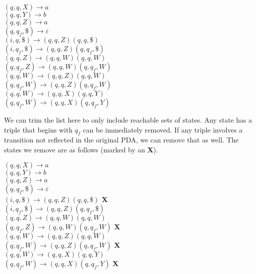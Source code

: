 \documentclass{article}
\begin{document}
\begin{center}
	$(q, q, X) \rightarrow a$ \\
	$(q, q, Y) \rightarrow b$ \\
	$(q, q, Z) \rightarrow a$ \\
	$(q, q_f, \$) \rightarrow \varepsilon$ \\
	\hfill \break
	$(i, q, \$) \rightarrow (q, q, Z)(q, q, \$)$ \\ 
	$(i, q_f, \$) \rightarrow (q, q, Z)(q, q_f, \$)$ \\
	\hfill \break
	$(q, q, Z) \rightarrow (q, q, W)(q, q, W)$ \\
	$(q, q_f, Z) \rightarrow (q, q, W)(q, q_f, W)$ \\
	\hfill \break
	$(q, q, W) \rightarrow (q, q, Z)(q, q, W)$ \\
	$(q, q_f, W) \rightarrow (q, q, Z)(q, q_f, W)$ \\
	\hfill \break
	$(q, q, W) \rightarrow (q, q, X)(q, q, Y)$ \\
	$(q, q_f, W) \rightarrow (q, q, X)(q, q_f, Y)$ \\
\end{center}

We can trim the list here to only include reachable sets of states. Any state has a triple that begins with $q_f$ can be immediately removed. If any triple involves a transition not reflected in the original PDA, we can remove that as well. The states we remove are as follows (marked by an \textbf{X}). 

\begin{center}
	$(q, q, X) \rightarrow a$ \\
	$(q, q, Y) \rightarrow b$ \\
	$(q, q, Z) \rightarrow a$ \\
	$(q, q_f, \$) \rightarrow \varepsilon$ \\
	\hfill \break
	$(i, q, \$) \rightarrow (q, q, Z)(q, q, \$)$ \textbf{X} \\ 
	$(i, q_f, \$) \rightarrow (q, q, Z)(q, q_f, \$)$ \\
	\hfill \break
	$(q, q, Z) \rightarrow (q, q, W)(q, q, W)$ \\
    $(q, q_f, Z) \rightarrow (q, q, W)(q, q_f, W)$ \textbf{X} \\
	\hfill \break
    $(q, q, W) \rightarrow (q, q, Z)(q, q, W)$ \\
    $(q, q_f, W) \rightarrow (q, q, Z)(q, q_f, W)$ \textbf{X} \\
	\hfill \break
    $(q, q, W) \rightarrow (q, q, X)(q, q, Y)$ \\
    $(q, q_f, W) \rightarrow (q, q, X)(q, q_f, Y)$ \textbf{X} \\
\end{center}
\end{document}
